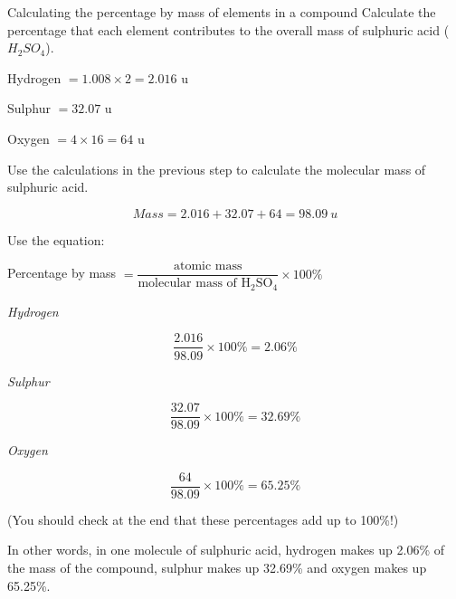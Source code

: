 \begin{wex}{Calculating the percentage by mass of elements in a compound}{
Calculate the percentage that each element contributes to the overall mass of sulphuric acid ($H_{2}SO_{4}$).\\}

{

Hydrogen $= 1.008 \times 2 = 2.016$ u

Sulphur $= 32.07$ u

Oxygen $= 4 \times 16 = 64$ u\\
}

{
Use the calculations in the previous step to calculate the molecular mass of sulphuric acid.

\begin{equation*}
Mass = 2.016 + 32.07 + 64 = 98.09 ~u
\end{equation*}
}


{

Use the equation:

\begin{center}
Percentage by mass $= \dfrac{\text{atomic mass}}{\text{molecular mass of H}_{2}\text{SO}_{4}} \times 100\%$
\end{center}


\textit{Hydrogen}

\begin{equation*}
\frac{2.016}{98.09} \times 100\% = 2.06\%
\end{equation*}

\textit{Sulphur}

\begin{equation*}
\frac{32.07}{98.09} \times 100\% = 32.69\%
\end{equation*}

\textit{Oxygen}

\begin{equation*}
\frac{64}{98.09} \times 100\% = 65.25\%
\end{equation*}


(You should check at the end that these percentages add up to 100\%!)

In other words, in one molecule of sulphuric acid, hydrogen makes up 2.06\% of the mass of the compound, sulphur makes up 32.69\% and oxygen makes up 65.25\%.
}

\end{wex}


